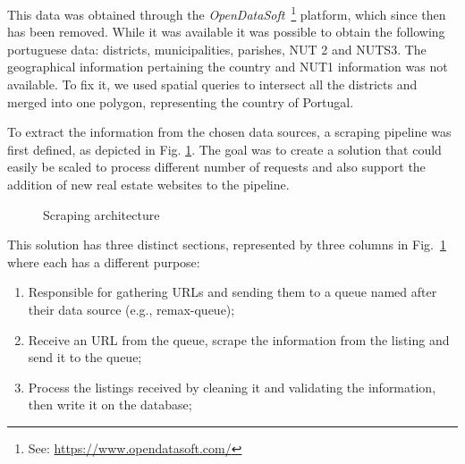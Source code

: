This data was obtained through the \textit{OpenDataSoft}~\footnote{See: \url{https://www.opendatasoft.com/}} platform, which since then has been removed. While it was available it was possible to obtain the following portuguese data: districts, municipalities, parishes, NUT 2 and NUTS3. The geographical information pertaining the country and NUT1 information was not available. To fix it, we used spatial queries to intersect all the districts and merged into one polygon, representing the country of Portugal.

To extract the information from the chosen data sources, a scraping pipeline was first defined, as depicted in Fig. \ref{fig:scraping-architecture}. The goal was to create a solution that could easily be scaled to process different number of requests and also support the addition of new real estate websites to the pipeline.

\begin{figure}[H]
	\centering
	
	\caption{Scraping architecture}
	\label{fig:scraping-architecture}
\end{figure}

This solution has three distinct sections, represented by three columns in Fig.~\ref{fig:scraping-architecture} where each has a different purpose:

\begin{enumerate}
    \item Responsible for gathering URLs and sending them to a queue named after their data source (e.g., remax-queue);
    \item Receive an URL from the queue, scrape the information from the listing and send it to the queue;
    \item Process the listings received by cleaning it and validating the information, then write it on the database;
\end{enumerate}

